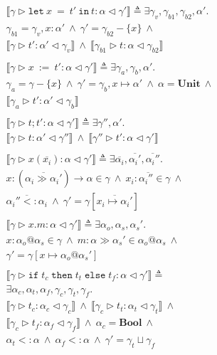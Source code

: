 \documentclass{article}
\newcommand{\inferrule}[4]{\llbracket #1 \triangleright #2 : #3 \triangleleft #4 \rrbracket}
\newcommand{\inferlhs}[1]{\llbracket \gamma \triangleright #1 : \alpha \triangleleft \gamma' \rrbracket}
\newcommand{\unitt}{\mathbf{Unit}}
\newcommand{\boolt}{\mathbf{Bool}}
\newcommand{\lett}[3]{\mathtt{let}\:#1\:\mathtt{=}\:#2\:\mathtt{in}\:#3}
\newcommand{\ift}[3]{\mathtt{if} \; #1 \; \mathtt{then} \; #2 \; \mathtt{else} \; #3}
\newcommand{\cand}{\:\wedge\:}
\begin{document}
\[\begin{array}{l}
\inferlhs{\lett{x}{t'}{t}} \triangleq \exists \gamma_v, \gamma_{b1}, \gamma_{b2}, \alpha' . \\
\gamma_{b1} = \gamma_v, x : \alpha'
\cand
\gamma' = \gamma_{b2} - \{ x \}
\cand \\
\inferrule{\gamma}{t'}{\alpha'}{\gamma_v}
\cand
\inferrule{\gamma_{b1}}{t}{\alpha}{\gamma_{b2}}
\\\\

\inferlhs{x\:\mathtt{:=}\:t'} \triangleq
\exists \gamma_a, \gamma_b, \alpha' . \\
\gamma_a = \gamma - \{ x \}
\cand
\gamma' = \gamma_b, x \mapsto \alpha'
\cand 
\alpha = \unitt
\cand \\
\inferrule{\gamma_a}{t'}{\alpha'}{\gamma_b}
\\\\

\inferlhs{t ; t'} \triangleq
\exists \gamma'', \alpha' . \\
\inferrule{\gamma}{t}{\alpha'}{\gamma''}
\cand
\inferrule{\gamma''}{t'}{\alpha}{\gamma'}
\\\\

\inferlhs{x ( \overline{x_i} )} \triangleq
\exists \overline{\alpha_i}, \overline{\alpha_i'},\overline{\alpha_i''} . \\
x : ( \overline{\alpha_i \gg \alpha_i'} ) \rightarrow \alpha \in \gamma
\cand 
\overline{x_i : \alpha_i'' \in \gamma}
\cand
\\ 
\overline{\alpha_i'' <: \alpha_i}
\cand
\gamma' = \gamma [ \overline{x_i \mapsto \alpha_i'} ]
\\\\

\inferlhs{x.m} \triangleq
\exists \alpha_o, \alpha_s, \alpha_s' . \\
x : \alpha_o @ \alpha_s \in \gamma
\cand 
m : \alpha \gg \alpha_s' \in \alpha_o @ \alpha_s
\cand  \\
\gamma' = \gamma[ x \mapsto \alpha_o @ \alpha_s' ]
\\\\

\inferlhs{\ift{t_c}{t_t}{t_f}} \triangleq
\\
\exists \alpha_c, \alpha_t, \alpha_f, \gamma_c, \gamma_t, \gamma_f . \\
\inferrule{\gamma}{t_c}{\alpha_c}{\gamma_c}
\cand
\inferrule{\gamma_c}{t_t}{\alpha_t}{\gamma_t}
\cand 
\\
\inferrule{\gamma_c}{t_f}{\alpha_f}{\gamma_f}
\cand
\alpha_c = \boolt
\cand
\\
\alpha_t <: \alpha
\cand
\alpha_f <: \alpha
\cand
\gamma' = \gamma_t \sqcup \gamma_f
\\\\

\end{array}
\]
\end{document}
